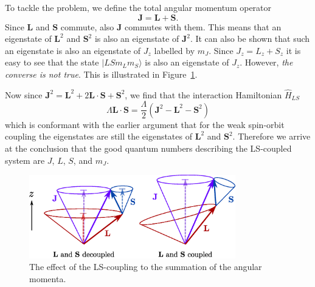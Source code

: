 

To tackle the problem, we define the total angular momentum operator 
\begin{equation}
\mathbf{J} = \mathbf{L} + \mathbf{S}.
\end{equation}
Since $\mathbf{L}$ and  $\mathbf{S}$ commute, also $\mathbf{J}$ commutes with them. This means that an eigenstate of $\mathbf{L}^2$ and $\mathbf{S}^2$ is also an eigenstate of $\mathbf{J}^2$. It can also be shown that such an eigenstate is also an eigenstate of $J_z$ labelled by $m_J$. Since $J_z = L_z + S_z$ it is easy to see that the state $|LSm_Lm_S\rangle$ is also an eigenstate of $J_z$. However, \emph{the converse is not true}. This is illustrated in Figure~\ref{fig:angular_momenta_sums}.

Now since $\mathbf{J}^2 = \mathbf{L}^2 + 2\mathbf{L} \cdot \mathbf{S} + \mathbf{S}^2$, we find that the interaction Hamiltonian $\hat{H}_{LS}$
\begin{equation}
\Lambda \mathbf{L} \cdot \mathbf{S} = \frac{\Lambda}{2}(\mathbf{J}^2-\mathbf{L}^2-\mathbf{S}^2 )
\end{equation}
which is conformant with the earlier argument that for the weak spin-orbit coupling the eigenstates are still the eigenstates of $\mathbf{L}^2$ and $\mathbf{S}^2$. Therefore we arrive at the conclusion that the good quantum numbers describing the LS-coupled system are $J$, $L$, $S$, and $m_J$. 

\begin{figure}
\centering
\includegraphics[width=0.8\textwidth]{magnetism/figures/angular_momenta_sums}
\caption{The effect of the LS-coupling to the summation of the angular momenta.\label{fig:angular_momenta_sums}}
\end{figure}

